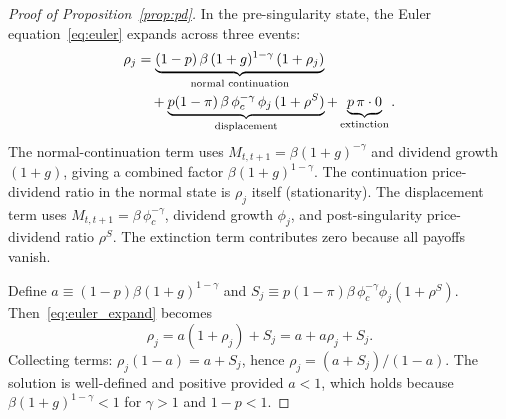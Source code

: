 \documentclass[12pt]{article}
\begin{document}
\begin{proof}[Proof of Proposition~\ref{prop:pd}]
In the pre-singularity state, the Euler equation~\eqref{eq:euler} expands across three events:
\begin{align}
\rho_j &= \underbrace{(1-p)\,\beta\,(1+g)^{1-\gamma}\,(1 + \rho_j)}_{\text{normal continuation}} \notag \\
       &\quad + \underbrace{p(1-\pi)\,\beta\,\phi_c^{-\gamma}\,\phi_j\,(1+\rho^S)}_{\text{displacement}} + \underbrace{p\,\pi \cdot 0}_{\text{extinction}}.
\label{eq:euler_expand} %
\end{align}
The normal-continuation term uses $M_{t,t+1} = \beta(1+g)^{-\gamma}$ and dividend growth $(1+g)$, giving a combined factor $\beta(1+g)^{1-\gamma}$.
The continuation price-dividend ratio in the normal state is $\rho_j$ itself (stationarity).
The displacement term uses $M_{t,t+1} = \beta\,\phi_c^{-\gamma}$, dividend growth $\phi_j$, and post-singularity price-dividend ratio $\rho^S$.
The extinction term contributes zero because all payoffs vanish.

Define $a \equiv (1-p)\beta(1+g)^{1-\gamma}$ and $S_j \equiv p(1-\pi)\beta\,\phi_c^{-\gamma}\phi_j(1+\rho^S)$.
Then~\eqref{eq:euler_expand} becomes
\begin{equation}
\rho_j = a(1 + \rho_j) + S_j = a + a\rho_j + S_j.
\label{eq:euler_linear} %
\end{equation}
Collecting terms: $\rho_j(1 - a) = a + S_j$, hence $\rho_j = (a + S_j)/(1 - a)$.
The solution is well-defined and positive provided $a < 1$, which holds because $\beta(1+g)^{1-\gamma} < 1$ for $\gamma > 1$ and $1 - p < 1$.
\end{proof}
\end{document}
